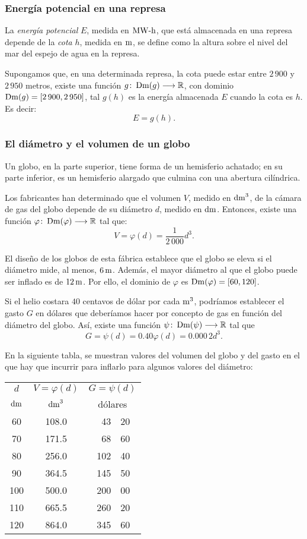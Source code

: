 \subsubsection{Energía potencial en una represa}
La \emph{energía potencial} $E$, medida en $\operatorname{MW-h}$, que está almacenada en una represa depende de la
\emph{cota} $h$, medida en $\operatorname{m}$, se define como la altura sobre el nivel del mar del espejo de
agua en la represa.

Supongamos que, en una determinada represa, la cota puede estar entre $2\,900$ y $2\,950$ metros,
existe una función $g\colon \operatorname{Dm}(g)\longrightarrow \mathbb{R}$, con dominio $\operatorname{Dm}(g)=[2\,900,2\,950]$, tal
$g(h)$ es la energía almacenada $E$ cuando la cota es $h$. Es decir:
\[
E=g(h).
\]

\subsubsection{El diámetro y el volumen de un globo}
Un globo, en la parte superior, tiene forma de un hemisferio achatado; en su parte inferior, es un
hemisferio alargado que culmina con una abertura cilíndrica.

Los fabricantes han determinado que el volumen $V$, medido en $\operatorname{dm}^3$, de la cámara de gas
del globo depende de su diámetro $d$, medido en $\operatorname{dm}$. Entonces, existe una función
$\varphi\colon \operatorname{Dm}(\varphi)\longrightarrow \mathbb{R}$ tal que:
\[
V = \varphi(d)=\frac{1}{2\,000}d^{3}.
\]

El diseño de los globos de esta fábrica establece que el globo se eleva si el diámetro mide, al
menos, $6\operatorname{m}$. Además, el mayor diámetro al que el globo puede ser inflado es de $12\operatorname{m}$.
Por ello, el dominio de $\varphi$ es $\operatorname{Dm}(\varphi)=[60,120]$.

Si el helio costara $40$ centavos de dólar por cada $\operatorname{m}^3$, podríamos establecer el gasto $G$
en dólares que deberíamos hacer por concepto de gas en función del diámetro del globo. Así, existe
una función $\psi\colon \operatorname{Dm}(\psi)\longrightarrow \mathbb{R}$ tal que
\[
G=\psi(d) = 0.40\varphi(d)=0.000\,2d^3.
\]

En la siguiente tabla, se muestran valores del volumen del globo y del gasto en el que hay que
incurrir para inflarlo para algunos valores del diámetro:
\begin{center}
\begingroup
\setlength\extrarowheight{4pt}
\begin{tabular}{|c |c |r @{.} l|}
\hline
$d$ & $V=\varphi(d)$ & \multicolumn{2}{|c|}{$G=\psi(d)$}  \\
{\small$\operatorname{dm}$} & $\operatorname{dm}^3$ & \multicolumn{2}{|c|}{dólares} \\
\hline
60  &  108.0 &  43&20 \\
\hline
70 & 171.5 & 68&60 \\
\hline
80 & 256.0  & 102&40 \\
\hline
90 & 364.5 & 145&50 \\
\hline
100 & 500.0 & 200&00 \\
\hline
110 & 665.5 & 260&20 \\
\hline
120 & 864.0 & 345&60 \\
\hline
\end{tabular}
\endgroup
\end{center}

